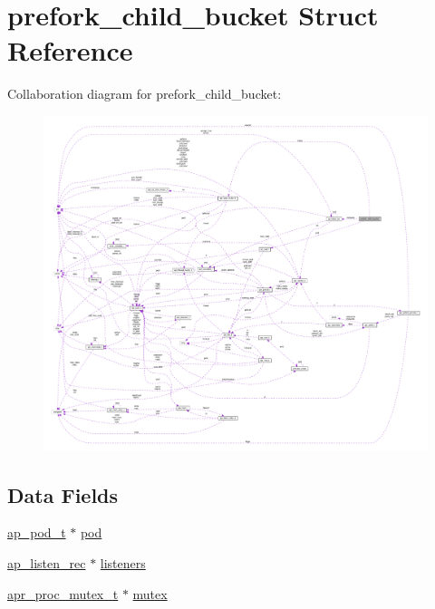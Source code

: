 \hypertarget{structprefork__child__bucket}{}\section{prefork\+\_\+child\+\_\+bucket Struct Reference}
\label{structprefork__child__bucket}


Collaboration diagram for prefork\+\_\+child\+\_\+bucket\+:
\nopagebreak
\begin{figure}[H]
\begin{center}
\leavevmode
\includegraphics[width=350pt]{structprefork__child__bucket__coll__graph}
\end{center}
\end{figure}
\subsection*{Data Fields}
\begin{DoxyCompactItemize}
\item 
\hyperlink{structap__pod__t}{ap\+\_\+pod\+\_\+t} $\ast$ \hyperlink{structprefork__child__bucket_aba326826c7fe4ad6a6869e087139afcc}{pod}
\item 
\hyperlink{structap__listen__rec}{ap\+\_\+listen\+\_\+rec} $\ast$ \hyperlink{structprefork__child__bucket_adfa2241ac0874c6e8c5007418bc91705}{listeners}
\item 
\hyperlink{structapr__proc__mutex__t}{apr\+\_\+proc\+\_\+mutex\+\_\+t} $\ast$ \hyperlink{structprefork__child__bucket_a8e2510a7f731c116aac1c22b3c80b35a}{mutex}
\end{DoxyCompactItemize}


